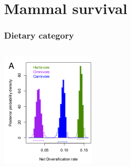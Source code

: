 \documentclass{beamer}
\begin{document}
\section{Mammal survival}

\begin{frame}
  \frametitle{Dietary category}
  \begin{columns}
    \begin{column}{0.5\textwidth}
      \begin{center}
        \includegraphics[height=0.4\textheight, width=\textwidth, keepaspectratio=true]{figure/dietdiv}

        \tiny{}


\end{center}
\end{column}
\end{columns}
\end{frame}
\end{document}
